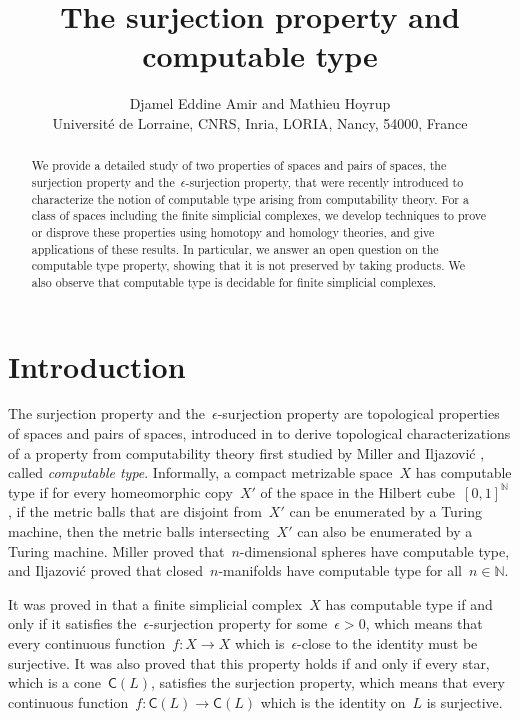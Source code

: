 \documentclass[english,11pt]{article}
\theoremstyle{plain}
\theoremstyle{remark}
\theoremstyle{definition}
\newcommand{\N}{\mathbb{N}}
\newcommand{\C}[1]{\mathsf{C}(#1)}%
\begin{document}
\title{The surjection property and computable type}

\author{Djamel Eddine Amir and Mathieu Hoyrup\\Universit\'e de Lorraine, CNRS, Inria, LORIA, Nancy, 54000, France}

\maketitle
\begin{abstract}
We provide a detailed study of two properties of spaces and pairs of spaces, the surjection property and the~$\epsilon$-surjection property, that were recently introduced to characterize the notion of computable type arising from computability theory. For a class of spaces including the finite simplicial complexes, we develop techniques to prove or disprove these properties using homotopy and homology theories, and give applications of these results. In particular, we answer an open question on the computable type property, showing that it is not preserved by taking products. We also observe that computable type is decidable for finite simplicial complexes.
\end{abstract}


\section{Introduction}

The surjection property and the~$\epsilon$-surjection property are topological properties of spaces and pairs of spaces, introduced in \cite{AH22} to derive topological characterizations of a property from computability theory first studied by Miller \cite{Miller02} and Iljazovi\'c \cite{Iljazovic13}, called \emph{computable type}. Informally, a compact metrizable space~$X$ has computable type if for every homeomorphic copy~$X'$ of the space in the Hilbert cube~$[0,1]^\N$, if the metric balls that are disjoint from~$X'$ can be enumerated by a Turing machine, then the metric balls intersecting~$X'$ can also be enumerated by a Turing machine. Miller \cite{Miller02} proved that~$n$-dimensional spheres have computable type, and Iljazovi\'c \cite{Iljazovic13} proved that closed~$n$-manifolds have computable type for all~$n\in\N$.

It was proved in \cite{AH22} that a finite simplicial complex~$X$ has computable type if and only if it satisfies the~$\epsilon$-surjection property for some~$\epsilon>0$, which means that every continuous function~$f:X\to X$ which is~$\epsilon$-close to the identity must be surjective. It was also proved that this property holds if and only if every star, which is a cone~$\C{L}$, satisfies the surjection property, which means that every continuous function~$f:\C{L}\to\C{L}$ which is the identity on~$L$ is surjective.
\end{document}
